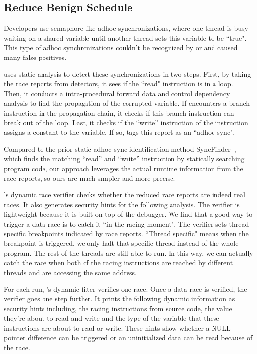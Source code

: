 \subsection{Reduce Benign Schedule} \label{sec:staticanalysis}

Developers use semaphore-like adhoc synchronizations, where one thread is
busy waiting on a shared variable until another thread sets this variable to be
``true". This type of adhoc synchronizations couldn't be recognized by \tsan or 
\ski and caused many false positives.

\xxx uses static analysis to detect these synchronizations in two steps. First, 
by taking the race reports from detectors, it sees if the ``read" instruction 
is in a loop. Then, it conducts a intra-procedural forward data and control 
dependency analysis to find the propagation of the corrupted variable. If \xxx 
encounters a branch instruction in the propagation chain, it checks if this 
branch instruction can break out of the loop. Last, it checks if the ``write'' 
instruction of the instruction assigns a constant to the variable. If so, \xxx 
tags this report as an ``adhoc sync".

Compared to the prior static adhoc sync identification 
method SyncFinder~\cite{syncfinder:osdi10}, which finds the 
matching ``read'' and ``write'' instruction by statically searching program 
code, our approach leverages the actual runtime information from the race 
reports, so ours are much simpler and more precise.

\xxx's dynamic race verifier checks whether the reduced race reports 
are indeed real races. It also generates security hints for the 
following analysis. The verifier is lightweight because it is built on top of 
the \lldb debugger. We find that a good way to trigger a data race is to catch 
it ``in the racing moment". The verifier sets thread specific breakpoints 
indicated by \tsan race reports. ``Thread specific" means when the breakpoint 
is triggered, we only halt that specific thread instead of the whole program. 
The rest of the threads are still able to run. In this way, we can actually 
catch the race when both of the racing instructions are reached by different 
threads and are accessing the same address.


For each run, \xxx's dynamic filter verifies one race. Once a data race is 
verified, the verifier goes one step further. It prints the following dynamic
information as security hints including, the racing instructions from source
code, the value they're about to read and write and the type of the variable
that these instructions are about to read or write. These hints show whether a 
NULL pointer difference can be triggered or an uninitialized data can be read 
because of the race.

